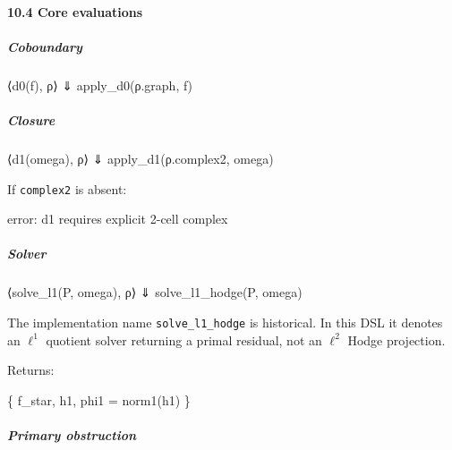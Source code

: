 \documentclass[
]{article}
\newenvironment{Shaded}{\begin{snugshade}}{\end{snugshade}}
\newcommand{\NormalTok}[1]{\textcolor[rgb]{0.12,0.11,0.11}{#1}}
\begin{document}
\paragraph{10.4 Core evaluations}\label{core-evaluations}

\subparagraph{Coboundary}\label{coboundary}

\begin{Shaded}
\begin{Highlighting}[]
\NormalTok{⟨d0(f), ρ⟩ ⇓ apply\_d0(ρ.graph, f)}
\end{Highlighting}
\end{Shaded}

\subparagraph{Closure}\label{closure}

\begin{Shaded}
\begin{Highlighting}[]
\NormalTok{⟨d1(omega), ρ⟩ ⇓ apply\_d1(ρ.complex2, omega)}
\end{Highlighting}
\end{Shaded}

If \texttt{complex2} is absent:

\begin{Shaded}
\begin{Highlighting}[]
\NormalTok{error: d1 requires explicit 2{-}cell complex}
\end{Highlighting}
\end{Shaded}

\subparagraph{Solver}\label{solver}

\begin{Shaded}
\begin{Highlighting}[]
\NormalTok{⟨solve\_l1(P, omega), ρ⟩ ⇓ solve\_l1\_hodge(P, omega)}
\end{Highlighting}
\end{Shaded}

The implementation name \texttt{solve\_l1\_hodge} is historical. In this DSL it denotes an \(\ell^1\) quotient solver returning a primal residual, not an \(\ell^2\) Hodge projection.

Returns:

\begin{Shaded}
\begin{Highlighting}[]
\NormalTok{\{}
\NormalTok{  f\_star,}
\NormalTok{  h1,}
\NormalTok{  phi1 = norm1(h1)}
\NormalTok{\}}
\end{Highlighting}
\end{Shaded}

\subparagraph{Primary obstruction}\label{primary-obstruction}
\end{document}

